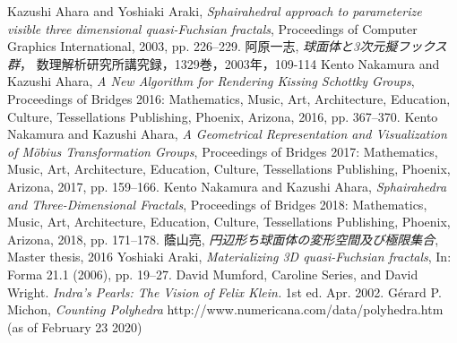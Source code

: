 \documentclass[suppldata, dvipdfmx]{interact}
\theoremstyle{plain}%
\theoremstyle{definition}
\theoremstyle{remark}
\theoremstyle{problemstyle}
\begin{document}
\begin{thebibliography}{99}
        Kazushi Ahara and Yoshiaki Araki,
        \emph{Sphairahedral approach to parameterize visible three
        dimensional quasi-Fuchsian fractals},
        Proceedings of Computer Graphics International, 2003,
        pp. 226--229.
        阿原一志, \emph{球面体と3次元擬フックス群}，
        数理解析研究所講究録，1329巻，2003年，109-114
        Kento Nakamura and Kazushi Ahara,
        \emph{A New Algorithm for Rendering Kissing Schottky Groups}, 
        Proceedings of Bridges 2016: Mathematics, Music, Art, Architecture,
        Education, Culture, Tessellations Publishing,
        Phoenix, Arizona, 2016, pp. 367--370.
        Kento Nakamura and Kazushi Ahara,
        \emph{A Geometrical Representation and Visualization of M\"{o}bius Transformation Groups}, 
        Proceedings of Bridges 2017: Mathematics, Music, Art, Architecture,
        Education, Culture, Tessellations Publishing,
        Phoenix, Arizona, 2017, pp. 159--166.
        Kento Nakamura and Kazushi Ahara,
        \emph{Sphairahedra and Three-Dimensional Fractals}, 
        Proceedings of Bridges 2018: Mathematics, Music, Art, Architecture,
        Education, Culture, Tessellations Publishing,
        Phoenix, Arizona, 2018, pp. 171--178.
        蔭山亮, 
        \emph{円辺形ち球面体の変形空間及び極限集合},
        Master thesis, 2016
        Yoshiaki Araki,
        \emph{Materializing 3D quasi-Fuchsian fractals},
        In: Forma 21.1 (2006), pp. 19–27.
        David Mumford, Caroline Series, and David Wright.
        \emph{Indra’s Pearls: The Vision of Felix Klein.}
        1st ed. Apr. 2002.
        G\'erard P. Michon, 
        \emph{Counting Polyhedra}
        http://www.numericana.com/data/polyhedra.htm
        (as of February 23 2020)
\end{thebibliography}
\end{document}
